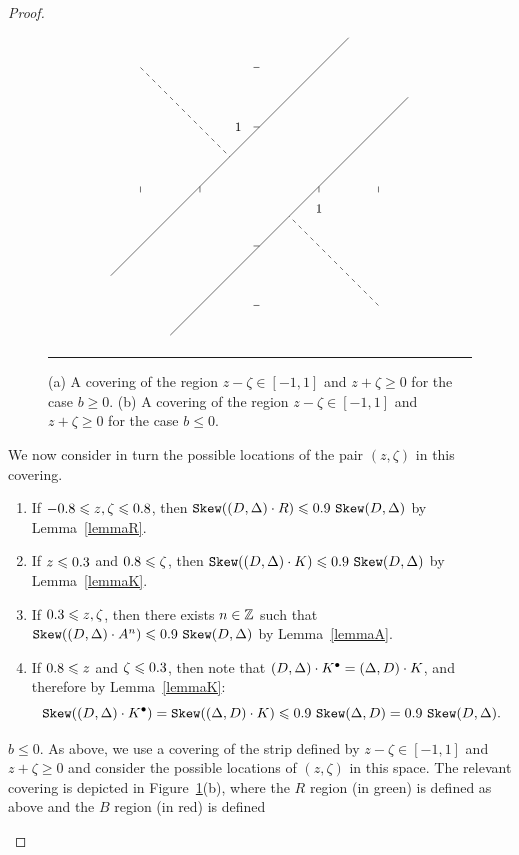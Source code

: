 \begin{proof}
\begin{description}
\begin{figure}
\[{\begin{tikzpicture}[scale=1.5]
      \foreach \x in {-2, -1, 1, 2} {
        \draw (\x,0) -- (\x,-0.1);
      }
      \foreach \y in {-2, -1, 1, 2} {
        \draw (0,\y) -- (-0.1,\y);
      }
      \draw (1,-0.1) node[below=1.2ex] {\small $1$};
      \draw (-0.1,1) node[left=1.2ex] {\small $1$};
      \draw (-1.5,-2.5) -- (2.5,1.5);
      \draw (-2.5,-1.5) -- (1.5,2.5);
      \draw [dashed] (-2, 2) -- (-0.5,0.5);    
      \begin{scope}[scale=-1]
      \draw [dashed] (-2, 2) -- (-0.5,0.5);          
      \end{scope}
    \end{tikzpicture}
  }
  \]
  \caption{(a) A covering of the region $z-\zeta\in [-1,1]$ and 
  $z+\zeta\geq 0$ for the case $b\geq 0$. (b) A covering of the 
  region $z-\zeta\in [-1,1]$ and $z+\zeta\geq 0$ for the case 
  $b\leq 0$.}
  \label{fig-covers}
  \rule{\textwidth}{0.1mm}
  \end{figure}
  We now consider in turn the possible locations of 
  the pair $(z,\zeta)$ in this covering. 
  \begin{enumerate}
    \item If $\formula{-\r}\leq z,\zeta \leq\formula{\r}$, 
    then $\sk(\state\cdot R)\leq \formula{\Qstep}~\sk\state$ by 
    Lemma~\ref{lemmaR}.
    \item \label{partk}If $z\leq\formula{-\a}$ and 
    $\formula{\r}\leq \zeta$, then 
    $\sk(\state\cdot K)\leq \formula{\Qstep}~\sk\state$ by 
    Lemma~\ref{lemmaK}.    
    \item If $\formula{-\a}\leq z,\zeta$, then there exists 
    $n\in\mathbb{Z}$ such that $\sk(\state\cdot A^n)\leq 
    \formula{\Qstep}~\sk\state$ by Lemma~\ref{lemmaA}.
    \item \label{partsk} If $\formula{\r}\leq z$ and 
    $\zeta\leq\formula{-\a}$, then note that 
    $(D,\Delta)\cdot K^\bullet = (\Delta, D)\cdot K$, and 
    therefore by Lemma~\ref{lemmaK}:
    \[
    \sk(\state\cdot K^\bullet) = \sk ((\Delta, D)\cdot K) 
    \leq \formula{\Qstep}~ \sk (\Delta, D)=
    \formula{\Qstep}~ \sk\state. 
    \]    
  \end{enumerate}
  \item[Case 2] $b\leq 0$. As above, we use a covering of 
  the strip defined by $z-\zeta\in[-1,1]$ and $z+\zeta\geq 0$ and 
  consider the possible locations of $(z, \zeta)$ in this 
  space. The relevant covering is depicted in 
  Figure~\ref{fig-covers}(b), where the $R$ region (in green) 
  is defined as above and the $B$ region (in red) is defined 

\end{description}
\end{proof}
